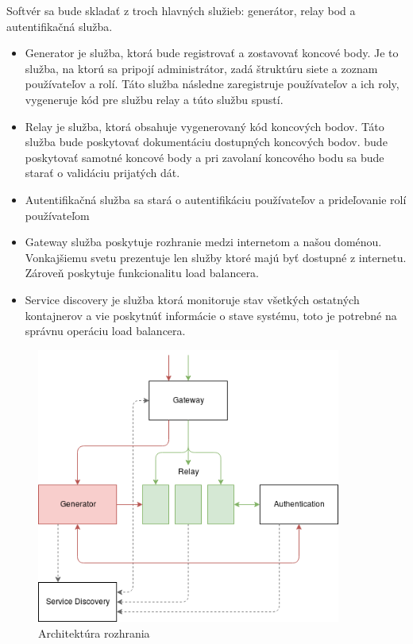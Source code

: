 Softvér sa bude skladať z troch hlavných služieb: generátor, relay bod a autentifikačná služba.

\begin{itemize}
    \item Generator je služba, ktorá bude registrovať a zostavovať koncové body. Je to služba, na ktorú sa pripojí administrátor, zadá štruktúru siete a zoznam používateľov a rolí. Táto služba následne zaregistruje používateľov a ich roly, vygeneruje kód pre službu relay a túto službu spustí.
	\item Relay je služba, ktorá obsahuje vygenerovaný kód koncových bodov. Táto služba bude poskytovať dokumentáciu dostupných koncových bodov. bude poskytovať samotné koncové body a pri zavolaní koncového bodu sa bude starať o validáciu prijatých dát.
	\item Autentifikačná služba sa stará o autentifikáciu používateľov a prideľovanie rolí používateľom
	\item Gateway služba poskytuje rozhranie medzi internetom a našou doménou. Vonkajšiemu svetu prezentuje len služby ktoré majú byť dostupné z internetu. Zároveň poskytuje funkcionalitu load balancera.
    \item Service discovery je služba ktorá monitoruje stav všetkých ostatných kontajnerov a vie poskytnúť informácie o stave systému, toto je potrebné na správnu operáciu load balancera.
\end{itemize}

\begin{figure}[!htbp]
	\centering
	\includegraphics[width=10cm]{img/architecture.png}
	\caption{Architektúra rozhrania}
	\label{architecture}
\end{figure}

